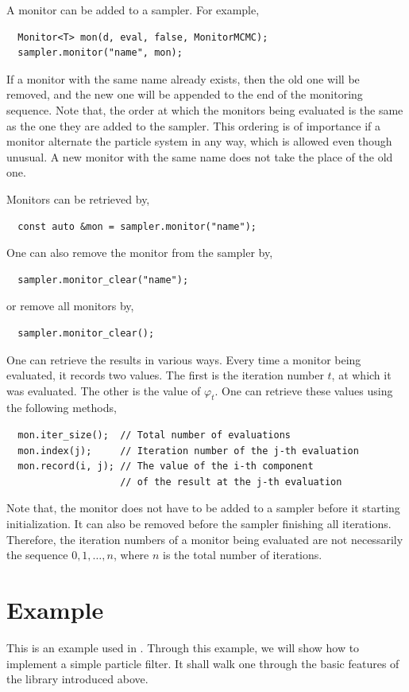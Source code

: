 A monitor can be added to a sampler. For example,
\begin{Verbatim}
  Monitor<T> mon(d, eval, false, MonitorMCMC);
  sampler.monitor("name", mon);
\end{Verbatim}
If a monitor with the same name already exists, then the old one will be
removed, and the new one will be appended to the end of the monitoring
sequence. Note that, the order at which the monitors being evaluated is the
same as the one they are added to the sampler. This ordering is of importance
if a monitor alternate the particle system in any way, which is allowed even
though unusual. A new monitor with the same name does not take the place of the
old one.

Monitors can be retrieved by,
\begin{Verbatim}
  const auto &mon = sampler.monitor("name");
\end{Verbatim}
One can also remove the monitor from the sampler by,
\begin{Verbatim}
  sampler.monitor_clear("name");
\end{Verbatim}
or remove all monitors by,
\begin{Verbatim}
  sampler.monitor_clear();
\end{Verbatim}
One can retrieve the results in various ways. Every time a monitor being
evaluated, it records two values. The first is the iteration number $t$, at
which it was evaluated. The other is the value of $\varphi_t$. One can retrieve
these values using the following methods,
\begin{Verbatim}
  mon.iter_size();  // Total number of evaluations
  mon.index(j);     // Iteration number of the j-th evaluation
  mon.record(i, j); // The value of the i-th component
                    // of the result at the j-th evaluation
\end{Verbatim}
Note that, the monitor does not have to be added to a sampler before it
starting initialization. It can also be removed before the sampler finishing
all iterations. Therefore, the iteration numbers of a monitor being evaluated
are not necessarily the sequence $0,1,\dots,n$, where $n$ is the total number
of iterations.

\section{Example}
\label{sec:Example (PF)}

This is an example used in \textcite{Johansen:2009wd}. Through this example, we
will show how to implement a simple particle filter. It shall walk one through
the basic features of the library introduced above.

